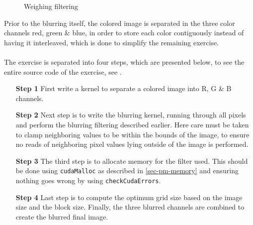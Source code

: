 \begin{figure}[ht]
	\centering
	\caption{Weighing filtering}
	\label{fig:ex2}
\end{figure}

Prior to the blurring itself, the colored image is separated in the three color channels red, green \& blue, in order to store each color contiguously instead of having it interleaved, which is done to simplify the remaining exercise.
\\\\
The exercise is separated into four steps, which are presented below, to see the entire source code of the exercise, see \cite{exercises}.

\begin{enumerate}
	\item[\textbf{Step 1}] First write a kernel to separate a colored image into R, G \& B channels.

	\item[\textbf{Step 2}] Next step is to write the blurring kernel, running through all pixels and perform the blurring filtering described earlier.
	Here care must be taken to clamp neighboring values to be within the bounds of the image, to ensure no reads of neighboring pixel values lying outside of the image is performed. 
	

	\item[\textbf{Step 3}] The third step is to allocate memory for the filter used.
	This should be done using \texttt{cudaMalloc} as described in \cref{sec-pm-memory} and ensuring nothing goes wrong by using \texttt{checkCudaErrors}.

	\item[\textbf{Step 4}] Last step is to compute the optimum grid size based on the image size and the block size.
	Finally, the three blurred channels are combined to create the blurred final image.
\end{enumerate}

